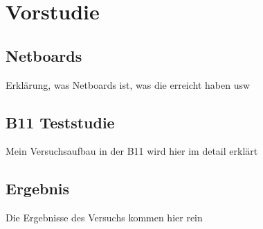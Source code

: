 \chapter{Vorstudie}\label{Vorstudie}
\section{Netboards}\label{Netboards}
Erklärung, was Netboards ist, was die erreicht haben usw
\section{B11 Teststudie}\label{B11 Teststudie}
Mein Versuchsaufbau in der B11 wird hier im detail erklärt
\section{Ergebnis}\label{Ergebnis}
Die Ergebnisse des Versuchs kommen hier rein